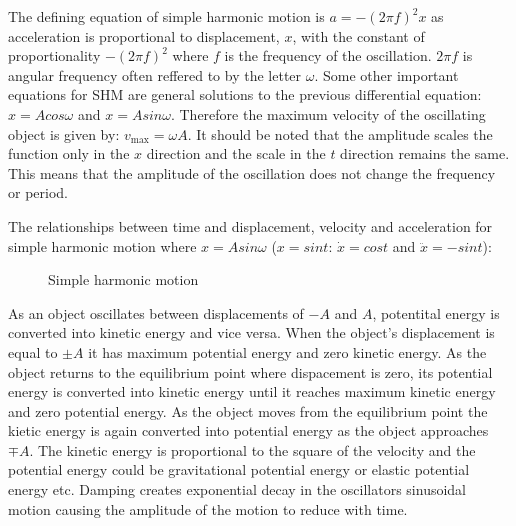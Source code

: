 \documentclass[a4,8pt]{article}
\begin{document}
The defining equation of simple harmonic motion is $a=-(2\pi f)^2 x$ as acceleration is proportional to displacement, $x$, with the constant of proportionality $-(2\pi f)^2$ where $f$ is the frequency of the oscillation. $2\pi f$ is angular frequency often reffered to by the letter $\omega$. Some other important equations for SHM are general solutions to the previous differential equation: $x=Acos\omega$ and $x=Asin\omega$. Therefore the maximum velocity of the oscillating object is given by: $v_\text{max}=\omega A$. It should be noted that the amplitude scales the function only in the $x$ direction and the scale in the $t$ direction remains the same. This means that the amplitude of the oscillation does not change the frequency or period.
\vspace{8pt}

The relationships between time and displacement, velocity and acceleration for simple harmonic motion where $x=Asin\omega$ ($x=sint$: $\dot{x}=cost$ and $\ddot{x}=-sint$):
\begin{figure}[H]
\begin{center}
\end{center}
\caption{Simple harmonic motion}
\end{figure}

As an object oscillates between displacements of $-A$ and $A$, potentital energy is converted into kinetic energy and vice versa. When the object's displacement is equal to $\pm A$ it has maximum potential energy and zero kinetic energy. As the object returns to the equilibrium point where dispacement is zero, its potential energy  is converted into kinetic energy until it reaches maximum kinetic energy and zero potential energy. As the object moves from the equilibrium point the kietic energy is again converted into potential energy as the object approaches $\mp A$. The kinetic energy is proportional to the square of the velocity and the potential energy could be gravitational potential energy or elastic potential energy etc. 
Damping creates exponential decay in the oscillators sinusoidal motion causing the amplitude of the motion to reduce with time.
\end{document}
